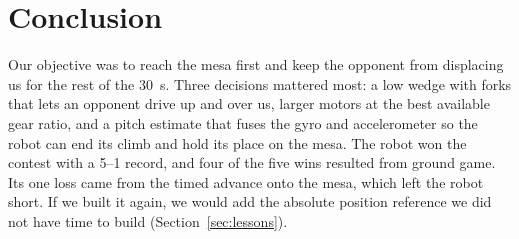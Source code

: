 \section{Conclusion}
\label{sec:conclusion}

Our objective was to reach the mesa first and keep the opponent from displacing us for the rest of the \qty{30}{s}. Three decisions mattered most: a low wedge with forks that lets an opponent drive up and over us, larger motors at the best available gear ratio, and a pitch estimate that fuses the gyro and accelerometer so the robot can end its climb and hold its place on the mesa. The robot won the contest with a 5--1 record, and four of the five wins resulted from ground game. Its one loss came from the timed advance onto the mesa, which left the robot short. If we built it again, we would add the absolute position reference we did not have time to build (Section~\ref{sec:lessons}).
